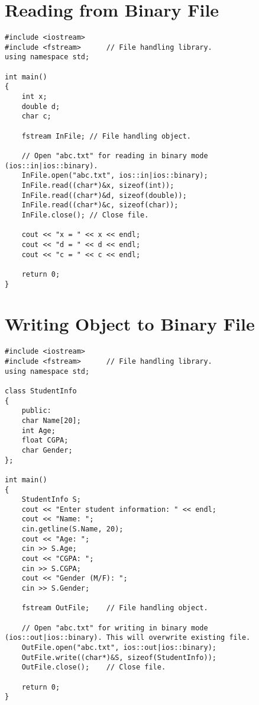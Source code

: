 \documentclass[12pt,a4paper]{article}
\begin{document}
\section{Reading from Binary File}
\begin{lstlisting}[caption={Reading from Binary file}]
#include <iostream>
#include <fstream>		// File handling library.
using namespace std;

int main()
{
	int x;
	double d;
	char c;

	fstream InFile;	// File handling object.

	// Open "abc.txt" for reading in binary mode (ios::in|ios::binary).
	InFile.open("abc.txt", ios::in|ios::binary);
	InFile.read((char*)&x, sizeof(int));
	InFile.read((char*)&d, sizeof(double));
	InFile.read((char*)&c, sizeof(char));
	InFile.close();	// Close file.

	cout << "x = " << x << endl;
	cout << "d = " << d << endl;
	cout << "c = " << c << endl;

	return 0;
}
\end{lstlisting}
\section{Writing Object to Binary File}
\begin{lstlisting}[caption={Writing an object to binary file}]
#include <iostream>
#include <fstream>		// File handling library.
using namespace std;

class StudentInfo
{
	public:
	char Name[20];
	int Age;
	float CGPA;
	char Gender;
};

int main()
{
	StudentInfo S;
	cout << "Enter student information: " << endl;
	cout << "Name: ";
	cin.getline(S.Name, 20);
	cout << "Age: ";
	cin >> S.Age;
	cout << "CGPA: ";
	cin >> S.CGPA;
	cout << "Gender (M/F): ";
	cin >> S.Gender;

	fstream OutFile;	// File handling object.

	// Open "abc.txt" for writing in binary mode (ios::out|ios::binary). This will overwrite existing file.
	OutFile.open("abc.txt", ios::out|ios::binary);
	OutFile.write((char*)&S, sizeof(StudentInfo));
	OutFile.close();	// Close file.

	return 0;
}
\end{lstlisting}
\newpage
\end{document}
